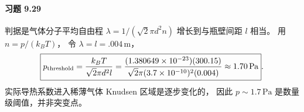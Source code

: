 \paragraph{习题 9.29}
判据是气体分子平均自由程
\(\lambda=1/(\sqrt2\pi d^2n)\)
增长到与瓶壁间距 \(l\) 相当。
用 \(n=p/(k_BT)\)，
令 \(\lambda=l=.004\,\mathrm m\)，
\[
 \boxed{p_{\rm threshold}
 =\frac{k_BT}{\sqrt2\pi d^2 l}
 =\frac{(1.380649\times10^{-23})(300.15)}
 {\sqrt2\pi(3.7\times10^{-10})^2(0.004)}
 \approx1.70\,\mathrm{Pa}}.
\]
实际导热系数进入稀薄气体
Knudsen 区域是逐步变化的，
因此 \(p\sim1.7\,\mathrm{Pa}\)
是数量级阈值，并非突变点。
